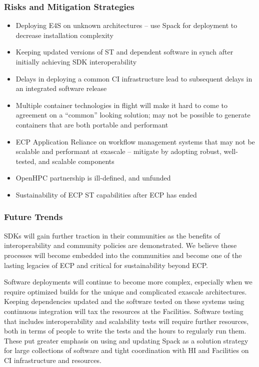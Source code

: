 \subsubsection{Risks and Mitigation Strategies}
\begin{itemize}
	\item Deploying E4S on unknown architectures -- use Spack for deployment to decrease installation complexity
        \item Keeping updated versions of ST and dependent software in synch after initially achieving SDK interoperability
	\item Delays in deploying a common CI infrastructure lead to subsequent delays in an integrated software release
	\item Multiple container technologies in flight will make it hard to come to agreement on a ``common'' looking solution; may not be possible to generate containers that are both portable and performant
	\item ECP Application Reliance on workflow management systems that may not be scalable and performant at exascale -- mitigate by adopting robust, well-tested, and scalable components 
	\item OpenHPC partnership is ill-defined, and unfunded
	\item Sustainability of ECP ST capabilities after ECP has ended
\end{itemize}

\subsubsection{Future Trends}

SDKs will gain further traction in their communities as the benefits of 
interoperability and community policies are demonstrated.  We believe these processes will
become embedded into the communities and become one of the lasting legacies of ECP and
critical for sustainability beyond ECP.

Software deployments will continue to become more complex, especially when we require optimized 
builds for the unique and complicated exascale architectures.  Keeping dependencies updated and 
the software tested on these systems using continuous integration will tax the resources at 
the Facilities.  Software testing that includes interoperability and scalability tests will 
require further resources, both in terms of people to write the tests and the hours to
regularly run them.  These put greater emphasis on using and updating Spack as a
solution strategy for large collections of software and tight coordination with
HI and Facilities on CI infrastructure and resources.

